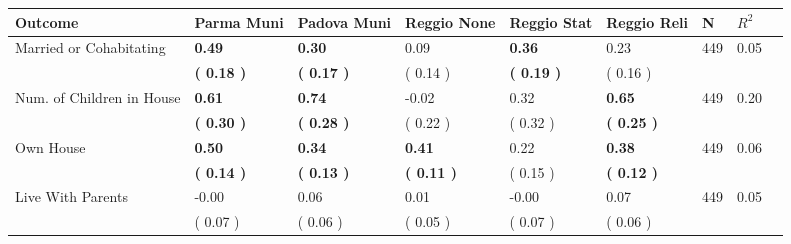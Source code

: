 \begin{tabular}{L{6.2cm} C{1.8cm} C{1.8cm} C{1.8cm} C{1.8cm} C{1.8cm} C{1.8cm} C{0.3cm} C{0.3cm}}
\toprule
 \textbf{Outcome} & \textbf{Parma Muni} & \textbf{Padova Muni} & \textbf{Reggio None} & \textbf{Reggio Stat} & \textbf{Reggio Reli} & \textbf{N} & \textbf{$ R^2$} \\
\midrule
Married or Cohabitating & \textbf{     0.49} & \textbf{     0.30} &      0.09 & \textbf{     0.36} &      0.23  & 449 &       0.05 \\ 
 & \textbf{(     0.18 )} & \textbf{(     0.17 )} & (     0.14 ) & \textbf{(     0.19 )} & (     0.16 )  & \\
Num. of Children in House & \textbf{     0.61} & \textbf{     0.74} &     -0.02 &      0.32 & \textbf{     0.65}  & 449 &       0.20 \\ 
 & \textbf{(     0.30 )} & \textbf{(     0.28 )} & (     0.22 ) & (     0.32 ) & \textbf{(     0.25 )}  & \\
Own House & \textbf{     0.50} & \textbf{     0.34} & \textbf{     0.41} &      0.22 & \textbf{     0.38}  & 449 &       0.06 \\ 
 & \textbf{(     0.14 )} & \textbf{(     0.13 )} & \textbf{(     0.11 )} & (     0.15 ) & \textbf{(     0.12 )}  & \\
Live With Parents &     -0.00 &      0.06 &      0.01 &     -0.00 &      0.07  & 449 &       0.05 \\ 
 & (     0.07 ) & (     0.06 ) & (     0.05 ) & (     0.07 ) & (     0.06 )  & \\
\bottomrule
\end{tabular}
